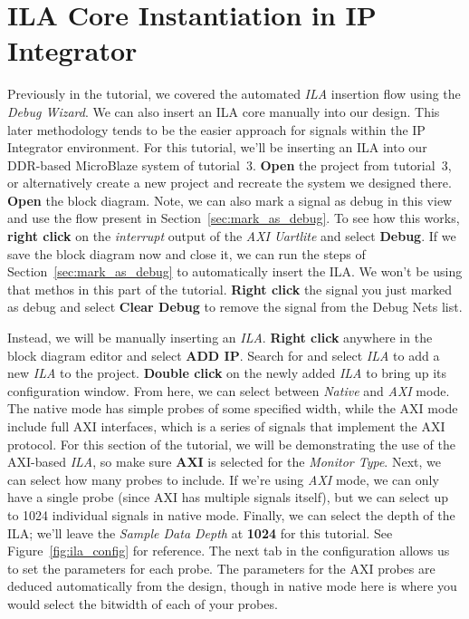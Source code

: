 \documentclass[11pt]{article}
\begin{document}
\section{ILA Core Instantiation in IP Integrator}
\label{sec:ila_core}
Previously in the tutorial, we covered the automated \textit{ILA} insertion flow using the \textit{Debug Wizard}. We can also insert an ILA core manually into our design. This later methodology tends to be the easier approach for signals within the IP Integrator environment. For this tutorial, we'll be inserting an ILA into our DDR-based MicroBlaze system of tutorial~3. \textbf{Open} the project from tutorial~3, or alternatively create a new project and recreate the system we designed there. \textbf{Open} the block diagram. Note, we can also mark a signal as debug in this view and use the flow present in Section~\ref{sec:mark_as_debug}. To see how this works, \textbf{right click} on the \textit{interrupt} output of the \textit{AXI Uartlite} and select \textbf{Debug}. If we save the block diagram now and close it, we can run the steps of Section~\ref{sec:mark_as_debug} to automatically insert the ILA. We won't be using that methos in this part of the tutorial. \textbf{Right click} the signal you just marked as debug and select \textbf{Clear Debug} to remove the signal from the Debug Nets list.

Instead, we will be manually inserting an \textit{ILA}. \textbf{Right click} anywhere in the block diagram editor and select \textbf{ADD IP}. Search for and select \textit{ILA} to add a new \textit{ILA} to the project. \textbf{Double click} on the newly added \textit{ILA} to bring up its configuration window. From here, we can select between \textit{Native} and \textit{AXI} mode. The native mode has simple probes of some specified width, while the AXI mode include full AXI interfaces, which is a series of signals that implement the AXI protocol. For this section of the tutorial, we will be demonstrating the use of the AXI-based \textit{ILA}, so make sure \textbf{AXI} is selected for the \textit{Monitor Type}. Next, we can select how many probes to include. If we're using \textit{AXI} mode, we can only have a single probe (since AXI has multiple signals itself), but we can select up to 1024 individual signals in native mode. Finally, we can select the depth of the ILA; we'll leave the \textit{Sample Data Depth} at \textbf{1024} for this tutorial. See Figure~\ref{fig:ila_config} for reference. The next tab in the configuration allows us to set the parameters for each probe. The parameters for the AXI probes are deduced automatically from the design, though in native mode here is where you would select the bitwidth of each of your probes.
\end{document}
